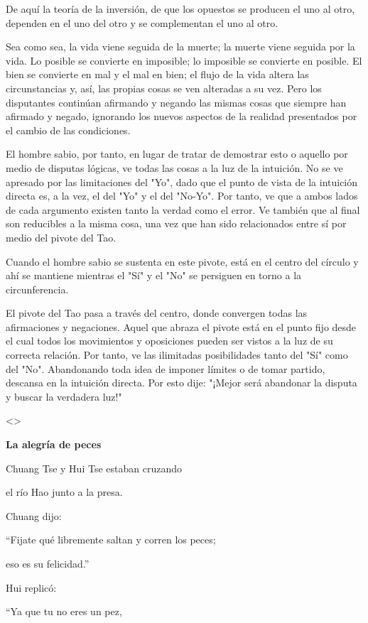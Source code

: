 De aquí la teoría de la inversión, de que los opuestos se producen el
uno al otro, dependen en el uno del otro y se complementan el uno al
otro.

Sea como sea, la vida viene seguida de la muerte; la muerte viene
seguida por la vida. Lo posible se convierte en imposible; lo imposible
se convierte en posible. El bien se convierte en mal y el mal en bien;
el flujo de la vida altera las circunstancias y, así, las propias cosas
se ven alteradas a su vez. Pero los disputantes continúan afirmando y
negando las mismas cosas que siempre han afirmado y negado, ignorando
los nuevos aspectos de la realidad presentados por el cambio de las
condiciones.

El hombre sabio, por tanto, en lugar de tratar de demostrar esto o
aquello por medio de disputas lógicas, ve todas las cosas a la luz de la
intuición. No se ve apresado por las limitaciones del "Yo", dado que el
punto de vista de la intuición directa es, a la vez, el del "Yo" y el
del "No-Yo". Por tanto, ve que a ambos lados de cada argumento existen
tanto la verdad como el error. Ve también que al final son reducibles a
la misma cosa, una vez que han sido relacionados entre sí por medio del
pivote del Tao.

Cuando el hombre sabio se sustenta en este pivote, está en el centro del
círculo y ahí se mantiene mientras el "Sí" y el "No" se persiguen en
torno a la circunferencia.

El pivote del Tao pasa a través del centro, donde convergen todas las
afirmaciones y negaciones. Aquel que abraza el pivote está en el punto
fijo desde el cual todos los movimientos y oposiciones pueden ser vistos
a la luz de su correcta relación. Por tanto, ve las ilimitadas
posibilidades tanto del "Sí" como del "No". Abandonando toda idea de
imponer límites o de tomar partido, descansa en la intuición directa.
Por esto dije: "¡Mejor será abandonar la disputa y buscar la verdadera
luz!"

\textless\textgreater{}

\textbf{{La alegría de peces}}

Chuang Tse y Hui Tse estaban cruzando

el río Hao junto a la presa.

Chuang dijo:

``Fijate qué libremente saltan y corren los peces;

eso es su felicidad.''

Hui replicó:

``Ya que tu no eres un pez,


